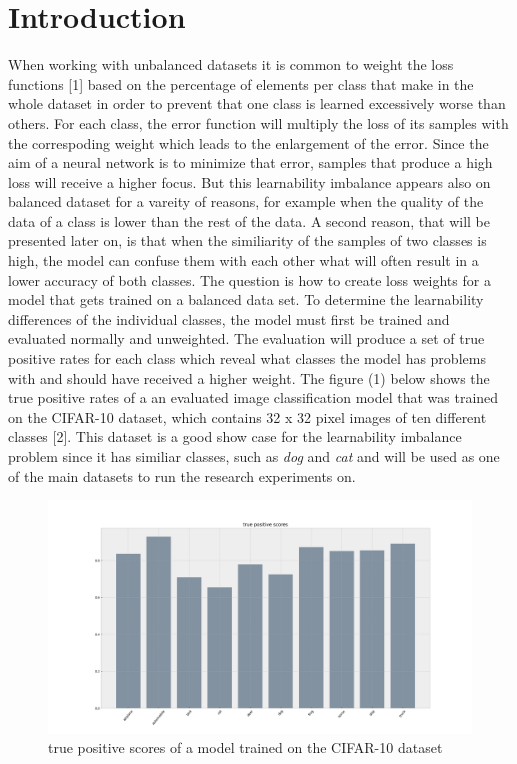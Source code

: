 \documentclass[journal]{IEEEtran}
\begin{document}
\section{Introduction}
When working with unbalanced datasets it is common to weight the loss functions [1] based on the percentage of elements per class that make in the whole dataset in order to prevent that one class is learned 
excessively worse than others.
For each class, the error function will multiply the loss of its samples with the correspoding weight which leads to the enlargement of the error. 
Since the aim of a neural network is to minimize that error, samples that produce a high loss will receive a higher focus.
But this learnability imbalance appears also on balanced dataset for a vareity of reasons, for example when the quality of the data of a class is lower than the rest of the data. 
A second reason, that will be presented later on, is that when the similiarity of the samples of two classes is high, 
the model can confuse them with each other what will often result in a lower accuracy of both classes.
The question is how to create loss weights for a model that gets trained on a balanced data set. To determine the learnability differences of the individual classes, the model must first be trained and evaluated normally and unweighted.
The evaluation will produce a set of true positive rates for each class which reveal what classes the model has problems with and should have received a higher weight. 
The figure (1) below shows the true positive rates of a an evaluated image classification model that was trained on the CIFAR-10 dataset, which contains 32 x 32 pixel images of ten different classes [2].
This dataset is a good show case for the learnability imbalance problem since it has similiar classes, such as \emph{dog} and \emph{cat} and will be used as one of the main datasets to run the research experiments on.

\begin{figure}[h!]
        \includegraphics[width=\linewidth]{images/cifar10_tp_scores.png}
        \caption{true positive scores of a model trained on the CIFAR-10 dataset}
        \label{fig:tp_scores}
\end{figure}
\end{document}

